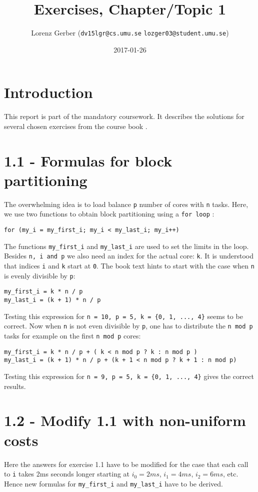 \documentclass[a4paper,11pt,twoside]{article}
\title{Exercises, Chapter/Topic 1}
\author{Lorenz Gerber ({\tt{dv15lgr@cs.umu.se}} {\tt{lozger03@student.umu.se}})}
\date{2017-01-26}
\begin{document}
\lstset{language=C}
\maketitle
\thispagestyle{empty}
\newpage
\tableofcontents
\thispagestyle{empty}
\newpage

\clearpage
{}

\section{Introduction}
This report is part of the mandatory coursework. It describes the solutions for several chosen exercises from the course book \cite{pacheco2011}.
\section{1.1 - Formulas for block partitioning}
The overwhelming idea is to load balance \verb+p+ number of cores with \verb+n+ tasks. Here, we use two functions to obtain block partitioning using a \verb+for loop+ :
\begin{verbatim}
for (my_i = my_first_i; my_i < my_last_i; my_i++)
\end{verbatim}

The functions \verb+my_first_i+ and \verb+my_last_i+ are used to set the limits in the loop. Besides \verb+n, i and p+ we also need an index for the actual core: \verb+k+. It is understood that indices \verb+i+ and \verb+k+ start at \verb+0+. The book text hints to start with the case when \verb+n+ is evenly divisible by \verb+p+:
\begin{verbatim}
my_first_i = k * n / p
my_last_i = (k + 1) * n / p
\end{verbatim}
Testing this expression for \verb!n = 10, p = 5, k = {0, 1, ..., 4}! seems to be correct. Now when  \verb+n+ is not even divisible by \verb+p+, one has to distribute the \verb+n mod p+ tasks for example on the first \verb+n mod p+ cores:
\begin{verbatim}
my_first_i = k * n / p + ( k < n mod p ? k : n mod p )
my_last_i = (k + 1) * n / p + (k + 1 < n mod p ? k + 1 : n mod p)  
\end{verbatim}
Testing this expression for \verb!n = 9, p = 5, k = {0, 1, ..., 4}! gives the correct results.
  
\section{1.2 - Modify 1.1 with non-uniform costs}
Here the answers for exercise 1.1 have to be modified for the case that each call to \verb+i+ takes 2ms seconds longer starting at $i_{0} = 2ms$, $i_{1} = 4ms$, $i_{2}=6ms$, etc. Hence new formulas for \verb+my_first_i+ and \verb+my_last_i+ have to be derived.
\end{document}
